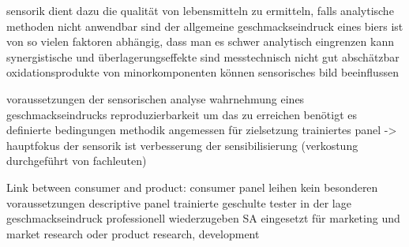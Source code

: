 \documentclass[]{scrartcl}
\begin{document}
sensorik dient dazu die qualität von lebensmitteln zu ermitteln, falls analytische methoden nicht anwendbar sind
der allgemeine geschmackseindruck eines biers ist von so vielen faktoren abhängig, dass man es schwer analytisch eingrenzen kann
synergistische und überlagerungseffekte sind messtechnisch nicht gut abschätzbar
oxidationsprodukte von minorkomponenten können sensorisches bild beeinflussen

voraussetzungen der sensorischen analyse
	wahrnehmung eines geschmackseindrucks
	reproduzierbarkeit
	um das zu erreichen benötigt es definierte bedingungen
	methodik angemessen für zielsetzung
	trainiertes panel -> hauptfokus der sensorik ist verbesserung der sensibilisierung (verkostung durchgeführt von fachleuten)

Link between consumer and product:
consumer panel
	leihen
	kein besonderen voraussetzungen
descriptive panel
	trainierte geschulte tester
	in der lage geschmackseindruck professionell wiederzugeben
SA eingesetzt für marketing und market research oder product research, development
\end{document}
